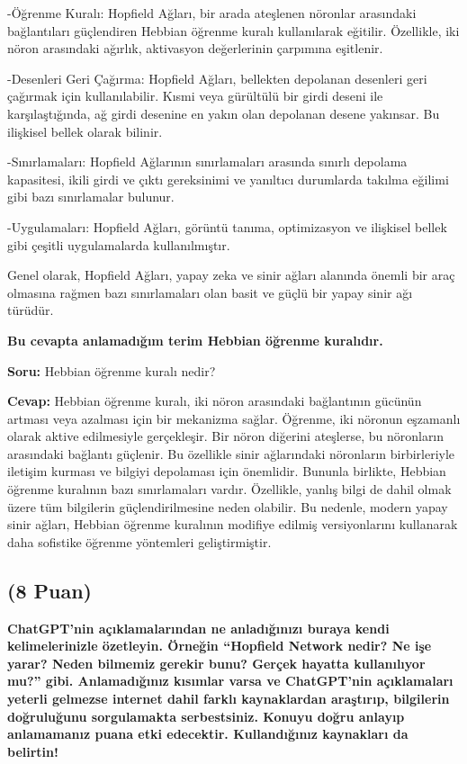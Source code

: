 \documentclass[11pt]{article}
\begin{document}
-Öğrenme Kuralı: Hopfield Ağları, bir arada ateşlenen nöronlar arasındaki bağlantıları güçlendiren Hebbian öğrenme kuralı kullanılarak eğitilir. Özellikle, iki nöron arasındaki ağırlık, aktivasyon değerlerinin çarpımına eşitlenir.

-Desenleri Geri Çağırma: Hopfield Ağları, bellekten depolanan desenleri geri çağırmak için kullanılabilir. Kısmi veya gürültülü bir girdi deseni ile karşılaştığında, ağ girdi desenine en yakın olan depolanan desene yakınsar. Bu ilişkisel bellek olarak bilinir.

-Sınırlamaları: Hopfield Ağlarının sınırlamaları arasında sınırlı depolama kapasitesi, ikili girdi ve çıktı gereksinimi ve yanıltıcı durumlarda takılma eğilimi gibi bazı sınırlamalar bulunur.

-Uygulamaları: Hopfield Ağları, görüntü tanıma, optimizasyon ve ilişkisel bellek gibi çeşitli uygulamalarda kullanılmıştır.

Genel olarak, Hopfield Ağları, yapay zeka ve sinir ağları alanında önemli bir araç olmasına rağmen bazı sınırlamaları olan basit ve güçlü bir yapay sinir ağı türüdür.

\textbf{Bu cevapta anlamadığım terim Hebbian öğrenme kuralıdır.}

\textbf{Soru:} Hebbian öğrenme kuralı nedir?

\textbf{Cevap:} Hebbian öğrenme kuralı, iki nöron arasındaki bağlantının gücünün artması veya azalması için bir mekanizma sağlar. Öğrenme, iki nöronun eşzamanlı olarak aktive edilmesiyle gerçekleşir. Bir nöron diğerini ateşlerse, bu nöronların arasındaki bağlantı güçlenir. Bu özellikle sinir ağlarındaki nöronların birbirleriyle iletişim kurması ve bilgiyi depolaması için önemlidir.
Bununla birlikte, Hebbian öğrenme kuralının bazı sınırlamaları vardır. Özellikle, yanlış bilgi de dahil olmak üzere tüm bilgilerin güçlendirilmesine neden olabilir. Bu nedenle, modern yapay sinir ağları, Hebbian öğrenme kuralının modifiye edilmiş versiyonlarını kullanarak daha sofistike öğrenme yöntemleri geliştirmiştir.


\subsection{(8 Puan)} \textbf{ChatGPT’nin açıklamalarından ne anladığınızı buraya kendi kelimelerinizle özetleyin. Örneğin ``Hopfield Network nedir? Ne işe yarar? Neden bilmemiz gerekir bunu? Gerçek hayatta kullanılıyor mu?'' gibi. Anlamadığınız kısımlar varsa ve ChatGPT’nin açıklamaları yeterli gelmezse internet dahil farklı kaynaklardan araştırıp, bilgilerin doğruluğunu sorgulamakta serbestsiniz. Konuyu doğru anlayıp anlamamanız puana etki edecektir. Kullandığınız kaynakları da belirtin!}
\end{document}
